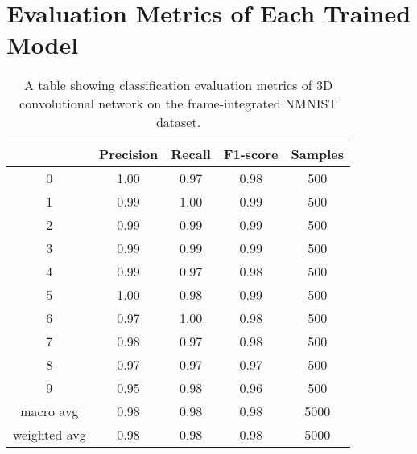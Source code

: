 \appendix
\chapter{Evaluation Metrics of Each Trained Model}

\begin{table}[htb]
    \centering
    \begin{tabular}{|| c | c | c | c | c ||}
        \hline
             & Precision & Recall & F1-score & Samples \\
        \hline \hline
        0            & 1.00  & 0.97  & 0.98 & 500 \\
        \hline
        1            & 0.99  & 1.00  & 0.99 & 500 \\
        \hline
        2            & 0.99  & 0.99  & 0.99 & 500 \\
        \hline
        3            & 0.99  & 0.99  & 0.99 & 500 \\
        \hline
        4            & 0.99  & 0.97  & 0.98 & 500 \\
        \hline
        5            & 1.00  & 0.98  & 0.99 & 500 \\
        \hline
        6            & 0.97  & 1.00  & 0.98 & 500 \\
        \hline
        7            & 0.98  & 0.97  & 0.98 & 500 \\
        \hline
        8            & 0.97  & 0.97  & 0.97 & 500 \\
        \hline
        9            & 0.95  & 0.98  & 0.96 & 500 \\
        \hline
        macro avg    & 0.98  & 0.98  & 0.98 & 5000 \\
        \hline
        weighted avg & 0.98  & 0.98  & 0.98 & 5000 \\
        \hline
    \end{tabular}
    \caption{A table showing classification evaluation metrics of 3D convolutional network on the frame-integrated NMNIST dataset.}
    \label{tab:conv3d_nmnist_evaluation_metrics}
\end{table}

